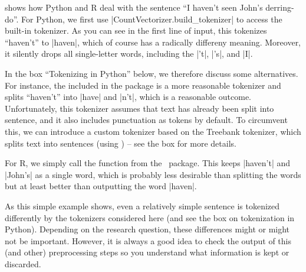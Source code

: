  shows how Python and R deal with the sentence ``I haven't seen John's derring-do''.
For Python, we first use |CountVectorizer.build_tokenizer| to access the built-in tokenizer.
As you can see in the first line of input, this tokenizes ``haven't'' to |haven|,
which of course has a radically differeny meaning. Moreover, it silently drops all single-letter words,
including the |'t|, |'s|, and |I|.

In the box ``Tokenizing in Python'' below, we therefore discuss some alternatives. For instance, the  included in the  package is a more reasonable tokenizer and 
splits ``haven't'' into |have| and |n't|, which is a reasonable outcome.
Unfortunately, this tokenizer assumes that text has already been split into sentence,
and it also includes punctuation as tokens by default.
To circumvent this, we can introduce a custom tokenizer based on the Treebank tokenizer,
which splits text into sentences (using ) -- see the box for more details.

For R, we simply call the  function from the \quanteda\ package.
This keeps |haven't| and |John's| as a single word, which is probably less desirable than splitting the words
but at least better than outputting the word |haven|.

As this simple example shows, even a relatively simple sentence is tokenized differently by the tokenizers considered here (and see the box on tokenization in Python).
Depending on the research question, these differences might or might not be important.
However, it is always a good idea to check the output of this (and other) preprocessing steps so you understand
what information is kept or discarded.

